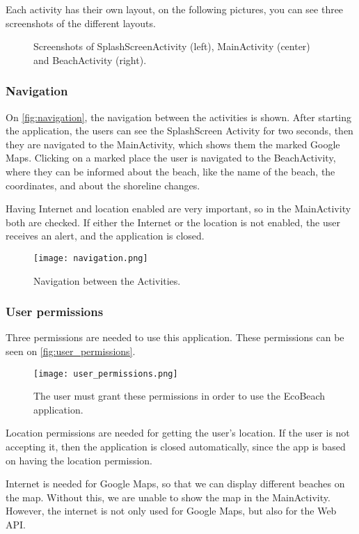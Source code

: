 Each activity has their own layout, on the following pictures, you can see three screenshots of the different layouts.


\begin{figure}[h!]
    \centering
    \caption{Screenshots of SplashScreenActivity (left), MainActivity (center) and BeachActivity (right).}
    \label{fig:activities}
\end{figure}

\subsubsection{Navigation}

On \autoref{fig:navigation}, the navigation between the activities is shown. After starting the application, the users can see the SplashScreen Activity for two seconds, then they are navigated to the MainActivity, which shows them the marked Google Maps. Clicking on a marked place the user is navigated to the BeachActivity, where they can be informed about the beach, like the name of the beach, the coordinates, and about the shoreline changes.

Having Internet and location enabled are very important, so in the MainActivity both are checked. If either the Internet or the location is not enabled, the user receives an alert, and the application is closed.

\begin{figure}[h!]
    \centering
    \texttt{[image: navigation.png]}
    \caption{Navigation between the Activities.}
    \label{fig:navigation}
\end{figure}

\subsubsection{User permissions}

Three permissions are needed to use this application. These permissions can be seen on \autoref{fig:user_permissions}.

\begin{figure}[h!]
    \centering
    \texttt{[image: user\_permissions.png]}
    \caption{The user must grant these permissions in order to use the EcoBeach application.}
    \label{fig:user_permissions}
\end{figure}

Location permissions are needed for getting the user’s location. If the user is not accepting it, then the application is closed automatically, since the app is based on having the location permission.

Internet is needed for Google Maps, so that we can display different beaches on the map. Without this, we are unable to show the map in the MainActivity. However, the internet is not only used for Google Maps, but also for the Web API.

